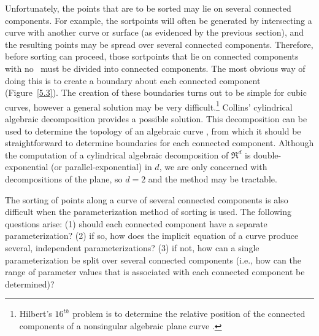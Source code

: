 Unfortunately, the points that are to be sorted
may lie on several connected components.
For example, the sortpoints will often be
generated by intersecting a curve with another curve or surface 
(as evidenced by the previous section), and the 
resulting points may be spread over several connected components.
Therefore, before sorting can proceed, those sortpoints that lie on 
connected components with no \wallpoints\
must be divided into connected components.
The most obvious way of doing this
is to create a boundary about 
%
%
each connected component (Figure~\ref{5.3}).
The creation of these boundaries turns out to be simple 
for cubic curves,
%
%
%
however a general solution may be very difficult.\footnote{Hilbert's 
$16^{th}$ problem is to determine the relative position
of the connected components of a nonsingular algebraic plane curve
\cite{kaplansky}.}
%
%
Collins' cylindrical algebraic decomposition provides a possible solution.
This decomposition can be used to determine the topology of an algebraic curve 
\cite{arnon83,kozen}, from which
it should be straightforward to determine boundaries for each connected 
component.
Although the computation of a cylindrical algebraic decomposition of
$\Re^{d}$ is double-exponential (or parallel-exponential) in $d$, we
are only concerned with decompositions of the plane, so $d=2$ and the
method may be tractable.



The sorting of points along a curve of several connected components 
is also difficult when the parameterization
method of sorting is used.
The following questions arise:
(1) should each connected component have a separate parameterization?
(2) if so, how does the implicit equation of a curve 
      produce several, independent parameterizations?
(3) if not, how can a single parameterization be split over several
      connected components
(i.e., how can the range of parameter values 
that is associated with each connected component be determined)?
%
%
